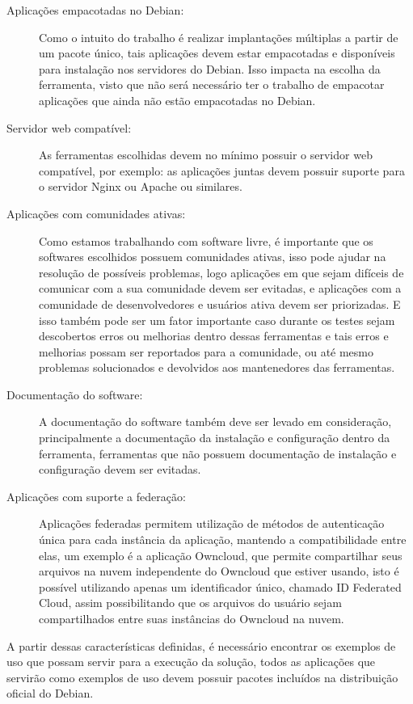 \begin{description}
  \item  [Aplicações empacotadas no Debian:] Como o intuito do trabalho
  é realizar implantações múltiplas a partir de um pacote único, tais aplicações
  devem estar empacotadas e disponíveis para instalação nos servidores do Debian.
  Isso impacta na escolha da ferramenta, visto que não será necessário ter o trabalho
  de empacotar aplicações que ainda não estão empacotadas no Debian.
  \item  [Servidor web compatível:] As ferramentas escolhidas devem no
  mínimo possuir o servidor web compatível, por exemplo: as aplicações juntas
  devem possuir suporte para o servidor Nginx ou Apache ou similares.
  \item  [Aplicações com comunidades ativas:] Como estamos trabalhando
  com software livre, é importante que os softwares escolhidos possuem comunidades
  ativas, isso pode ajudar na resolução de possíveis problemas, logo aplicações
  em que sejam difíceis de comunicar com a sua comunidade devem ser evitadas, e
  aplicações com a comunidade de desenvolvedores e usuários ativa devem ser priorizadas.
  E isso também pode ser um fator importante caso durante os testes sejam descobertos
  erros ou melhorias dentro dessas ferramentas e tais erros e melhorias possam ser
  reportados para a comunidade, ou até mesmo problemas solucionados e devolvidos aos mantenedores
  das ferramentas.
  \item  [Documentação do software:] A documentação do software também deve
  ser levado em consideração, principalmente a documentação da instalação e configuração
  dentro da ferramenta, ferramentas que não possuem documentação de instalação e
  configuração devem ser evitadas.
  \item  [Aplicações com suporte a federação:] Aplicações federadas permitem
 utilização de métodos de autenticação única para cada instância da aplicação,
mantendo a compatibilidade entre elas, um exemplo é a aplicação Owncloud,
que permite compartilhar seus arquivos na nuvem independente do Owncloud que estiver usando,
isto é possível utilizando apenas um identificador único, chamado ID Federated Cloud, assim
possibilitando que os arquivos do usuário sejam compartilhados entre suas instâncias do
Owncloud na nuvem.
\end{description}

A partir dessas características definidas, é necessário encontrar os exemplos de uso
que possam servir para a execução da solução, todos as aplicações que servirão como
exemplos de uso devem possuir pacotes incluídos na distribuição oficial do Debian.


